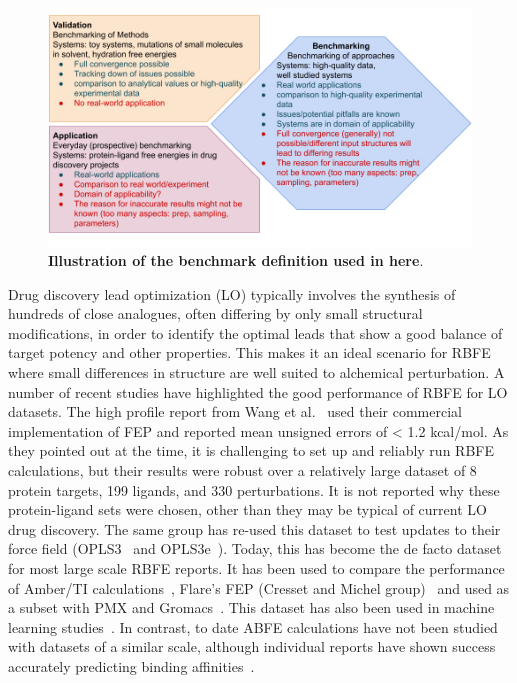 \documentclass[9pt,bestpractices]{livecoms}
\begin{document}
\begin{figure}
    \includegraphics[width=0.95\linewidth]{figures/introduction/benchmarking_definition.png}
    \caption{\textbf{Illustration of the benchmark definition used in here}.}
    \label{fig:benchmarking_definition}
\end{figure}

Drug discovery lead optimization (LO) typically involves the synthesis of hundreds of close analogues, often differing by only small structural modifications, in order to identify the optimal leads that show a good balance of target potency and other properties. This makes it an ideal scenario for RBFE where small differences in structure are well suited to alchemical perturbation. A number of recent studies have highlighted the good performance of RBFE for LO datasets. The high profile report from Wang et al.~\cite{wangAccurateReliablePrediction2015} used their commercial implementation of FEP and reported mean unsigned errors of < 1.2 kcal/mol. As they pointed out at the time, it is challenging to set up and reliably run RBFE calculations, but their results were robust over a relatively large dataset of 8 protein targets, 199 ligands, and 330 perturbations. It is not reported why these protein-ligand sets were chosen, other than they may be typical of current LO drug discovery. The same group has re-used this dataset to test updates to their force field (OPLS3~\cite{harder_opls3_2016} and OPLS3e~\cite{roos_opls3e_2019}). Today, this has become the de facto dataset for most large scale RBFE reports. It has been used to compare the performance of Amber/TI calculations~\cite{songUsingAMBER18Relative2019}, Flare’s FEP (Cresset and Michel group)~\cite{kuhnAssessmentBindingAffinity2020} and used as a subset with PMX and Gromacs~\cite{gapsysLargeScaleRelative2020}. This dataset has also been used in machine learning studies~\cite{jimenezDEEPProteinLigand2018,jimenez-lunaDeltaDeltaNeuralNetworks2019}. In contrast, to date ABFE calculations have not been studied with datasets of a similar scale, although individual reports have shown success accurately predicting binding affinities~\cite{aldeghiLargescaleAnalysisWater2018,courniaRigorousFreeEnergy2020}.
\end{document}

